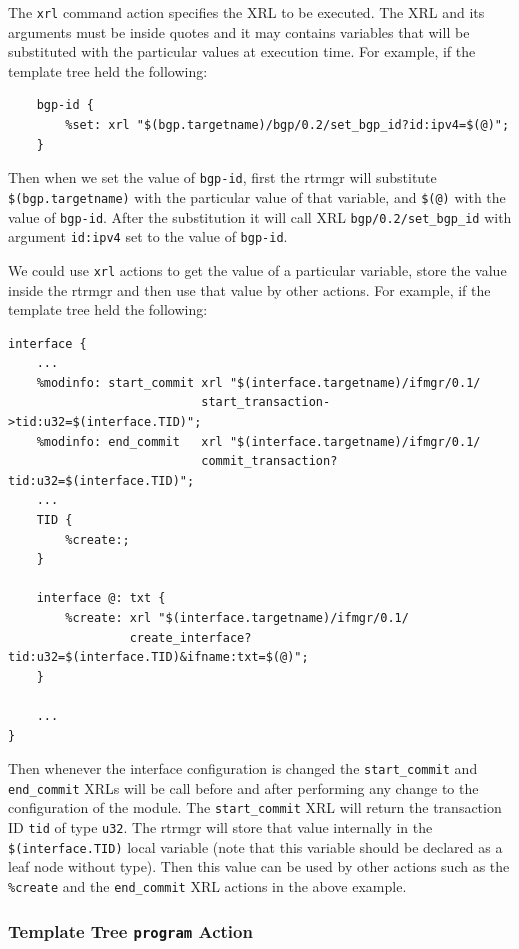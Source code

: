 \documentclass[11pt]{article}
\begin{document}
The {\tt xrl} command action specifies the XRL to be executed. The XRL
and its arguments must be inside quotes and it may contains variables
that will be substituted with the particular values at execution time.
For example, if the template tree held the following:

\begin{verbatim}
    bgp-id {
        %set: xrl "$(bgp.targetname)/bgp/0.2/set_bgp_id?id:ipv4=$(@)";
    }
\end{verbatim}

Then when we set the value of {\tt bgp-id}, first the rtrmgr will substitute
{\tt \$(bgp.targetname)} with the particular value of that variable, and
{\tt \$(@)} with the value of {\tt bgp-id}. After the substitution it will
call XRL {\tt bgp/0.2/set\_bgp\_id} with argument {\tt id:ipv4} set to the
value of {\tt bgp-id}.

We could use {\tt xrl} actions to get the value of a particular variable,
store the value inside the rtrmgr and then use that value by other actions.
For example, if the template tree held the following:

\begin{verbatim}
interface {
    ...
    %modinfo: start_commit xrl "$(interface.targetname)/ifmgr/0.1/
                           start_transaction->tid:u32=$(interface.TID)";
    %modinfo: end_commit   xrl "$(interface.targetname)/ifmgr/0.1/
                           commit_transaction?tid:u32=$(interface.TID)";
    ...
    TID {
        %create:;
    }

    interface @: txt {
        %create: xrl "$(interface.targetname)/ifmgr/0.1/
                 create_interface?tid:u32=$(interface.TID)&ifname:txt=$(@)";
    }

    ...
}
\end{verbatim}

Then whenever the interface configuration is changed the {\tt start\_commit}
and {\tt end\_commit} XRLs will be call before and after performing any change
to the configuration of the module. The {\tt start\_commit} XRL will return
the transaction ID {\tt tid} of type {\tt u32}. The rtrmgr will store
that value internally in the {\tt \$(interface.TID)} local variable
(note that this variable should be declared as a leaf node without type).
Then this value can be used by other actions such as the
{\tt \%create} and the {\tt end\_commit} XRL actions in the above example.

\subsubsection{Template Tree {\tt program} Action}
\end{document}
